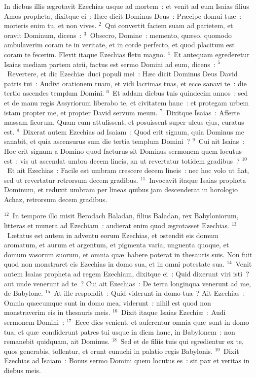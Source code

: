 \bchapter
\lettrine[lines=3,image=true,loversize=0.05,lraise=-0.03]{I}{}n diebus illis \ae grotavit Ezechias usque ad mortem~: et venit ad eum Isaias filius Amos propheta, dixitque ei~: H\ae c dicit Dominus Deus~: Pr\ae cipe domui tu\ae~: morieris enim tu, et non vives.
${}^{2}$~Qui convertit faciem suam ad parietem, et oravit Dominum, dicens~:
${}^{3}$~Obsecro, Domine~: memento, qu\ae so, quomodo ambulaverim coram te in veritate, et in corde perfecto, et quod placitum est coram te fecerim. Flevit itaque Ezechias fletu magno.
${}^{4}$~Et antequam egrederetur Isaias mediam partem atrii, factus est sermo Domini ad eum, dicens~:
${}^{5}$~Revertere, et dic Ezechi\ae\ duci populi mei~: H\ae c dicit Dominus Deus David patris tui~: Audivi orationem tuam, et vidi lacrimas tuas, et ecce sanavi te~: die tertio ascendes templum Domini.
${}^{6}$~Et addam diebus tuis quindecim annos~: sed et de manu regis Assyriorum liberabo te, et civitatem hanc~: et protegam urbem istam propter me, et propter David servum meum.
${}^{7}$~Dixitque Isaias~: Afferte massam ficorum. Quam cum attulissent, et posuissent super ulcus ejus, curatus est.
${}^{8}$~Dixerat autem Ezechias ad Isaiam~: Quod erit signum, quia Dominus me sanabit, et quia ascensurus sum die tertia templum Domini~?
${}^{9}$~Cui ait Isaias~: Hoc erit signum a Domino quod facturus sit Dominus sermonem quem locutus est~: vis ut ascendat umbra decem lineis, an ut revertatur totidem gradibus~?
${}^{10}$~Et ait Ezechias~: Facile est umbram crescere decem lineis~: nec hoc volo ut fiat, sed ut revertatur retrorsum decem gradibus.
${}^{11}$~Invocavit itaque Isaias propheta Dominum, et reduxit umbram per lineas quibus jam descenderat in horologio Achaz, retrorsum decem gradibus.


${}^{12}$~In tempore illo misit Berodach Baladan, filius Baladan, rex Babyloniorum, litteras et munera ad Ezechiam~: audierat enim quod \ae grotasset Ezechias.
${}^{13}$~L\ae tatus est autem in adventu eorum Ezechias, et ostendit eis domum aromatum, et aurum et argentum, et pigmenta varia, unguenta quoque, et domum vasorum suorum, et omnia qu\ae\ habere poterat in thesauris suis. Non fuit quod non monstraret eis Ezechias in domo sua, et in omni potestate sua.
${}^{14}$~Venit autem Isaias propheta ad regem Ezechiam, dixitque ei~: Quid dixerunt viri isti~? aut unde venerunt ad te~? Cui ait Ezechias~: De terra longinqua venerunt ad me, de Babylone.
${}^{15}$~At ille respondit~: Quid viderunt in domo tua~? Ait Ezechias~: Omnia qu\ae cumque sunt in domo mea, viderunt~: nihil est quod non monstraverim eis in thesauris meis.
${}^{16}$~Dixit itaque Isaias Ezechi\ae~: Audi sermonem Domini~:
${}^{17}$~Ecce dies venient, et auferentur omnia qu\ae\ sunt in domo tua, et qu\ae\ condiderunt patres tui usque in diem hanc, in Babylonem~: non remanebit quidquam, ait Dominus.
${}^{18}$~Sed et de filiis tuis qui egredientur ex te, quos generabis, tollentur, et erunt eunuchi in palatio regis Babylonis.
${}^{19}$~Dixit Ezechias ad Isaiam~: Bonus sermo Domini quem locutus es~: sit pax et veritas in diebus meis.


